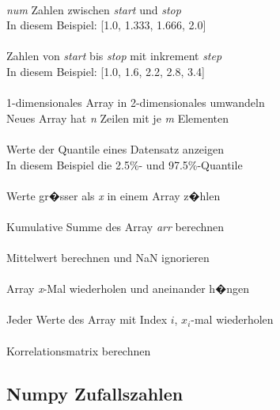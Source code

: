 \documentclass{article}
\begin{document}
\begin{multicols*}{3}
 \\
\textit{num} Zahlen zwischen \textit{start} und \textit{stop} \\
In diesem Beispiel: [1.0, 1.333, 1.666, 2.0] \\

 \\
Zahlen von \textit{start} bis \textit{stop} mit inkrement \textit{step} \\
In diesem Beispiel: [1.0, 1.6, 2.2, 2.8, 3.4] \\

 \\
1-dimensionales Array in 2-dimensionales umwandeln \\
Neues Array hat \textit{n} Zeilen mit je \textit{m} Elementen \\

 \\
Werte der Quantile eines Datensatz anzeigen \\
In diesem Beispiel die 2.5\%- und 97.5\%-Quantile \\

 \\
Werte gr�sser als \textit{x} in einem Array z�hlen \\

 \\
Kumulative Summe des Array \textit{arr} berechnen\\

 \\
Mittelwert berechnen und NaN ignorieren \\

 \\
Array \textit{x}-Mal wiederholen und aneinander h�ngen \\

 \\
Jeder Werte des Array mit Index $i$, $x_i$-mal wiederholen \\

 \\
Korrelationsmatrix berechnen

\subsection*{Numpy Zufallszahlen}


\end{multicols*}
\end{document}
